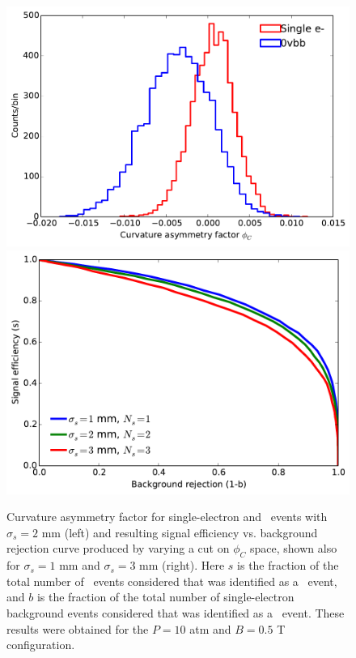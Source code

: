 \documentclass{JINST}
\begin{document}
\begin{figure}[!htb]
	\includegraphics[scale=0.44]{fig/10atm_05T_scurv_diff_means.pdf}
	\includegraphics[scale=0.44]{fig/10atm_05T_sigvsb_all.pdf}
	\caption{\label{fig_svsbg}Curvature asymmetry factor for single-electron and \bbonu\ events with $\sigma_{s} = 2$ mm  (left) and resulting signal efficiency vs. background rejection curve produced by varying a cut on $\phi_{C}$ space, shown also for $\sigma_{s} = 1$ mm and $\sigma_{s} = 3$ mm (right).  Here $s$ is the fraction of the total number of \bbonu\ events considered that was identified as a \bbonu\ event, and $b$ is the fraction of the total number of single-electron background events considered that was identified as a \bbonu\ event.  These results were obtained for the $P = 10$ atm and $B = 0.5$ T configuration.}
\end{figure}
\end{document}
